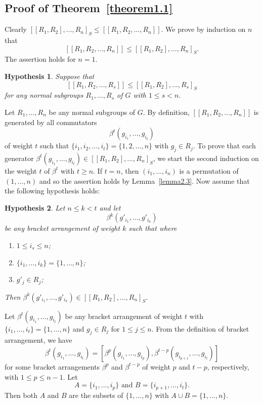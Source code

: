 \documentclass[10pt]{amsart}
\newtheorem{hypothesis}{Hypothesis}[section]
\numberwithin{equation}{section}
\begin{document}
\subsection{Proof of Theorem~\ref{theorem1.1}}
Clearly $[[R_1,R_2],\ldots,R_n]_S\leq [[R_1,R_2,\ldots, R_n]]$. We prove by induction on $n$ that $$[[R_1,R_2,\ldots,R_n]]\leq [[R_1,R_2],\ldots,R_n]_S.$$ The assertion holds for $n=1$.
\begin{hypothesis}\label{induction1}
Suppose that
$$
[[R_1,R_2,\ldots, R_s]]\leq [[R_1,R_2],\ldots, R_s]_S
$$
for any normal subgroups $R_1,\ldots,R_s$ of $G$ with $1\leq s<n$.
\end{hypothesis}

Let $R_1,\ldots, R_n$ be any normal subgroups of $G$. By definition, $[[R_1,R_2,\ldots,R_n]]$ is generated by all commutators $$\beta^t(g_{i_1},\ldots,g_{i_t})$$ of weight $t$ such that
$\{i_1,i_2,\ldots,i_t\}=\{1,2,\ldots,n\}$ with $g_j\in R_j$. To prove that each generator $\beta^t(g_{i_1},\ldots,g_{i_t})\in [[R_1,R_2],\ldots,R_n]_S$, we start the second induction on the weight $t$ of $\beta^t$ with $t\geq n$. If $t=n$, then $(i_1,\ldots,i_n)$ is a permutation of $(1,\ldots,n)$ and so the assertion holds by Lemma~\ref{lemma2.3}. Now assume that the following hypothesis holds:

\begin{hypothesis}\label{induction2}
Let $n\leq k<t$ and let
$$
\beta^k(g'_{i_1},\ldots,g'_{i_k})
$$
be any bracket arrangement of weight $k$ such that
where
\begin{enumerate}
\item[1)] $1\leq i_s\leq n$;
\item[2)] $\{i_1,\ldots,i_k\}=\{1,\ldots,n\}$;
\item[3)] $g'_j\in R_j$;
\end{enumerate}
Then $\beta^k(g'_{i_1},\ldots,g'_{i_k})\in [[R_1,R_2],\ldots,R_n]_S$.
\end{hypothesis}

Let $\beta^t(g_{i_1},\ldots,g_{i_t})$ be any bracket arrangement of weight $t$ with $\{i_1,\ldots,i_t\}=\{1,\ldots,n\}$ and $g_j\in R_j$ for $1\leq j\leq n$. From the definition of bracket arrangement, we have
$$
\beta^t(g_{i_1},\ldots,g_{i_t})=[\beta^p(g_{i_1},\ldots,g_{i_p}), \beta^{t-p}(g_{i_{p+1}},\ldots,g_{i_t})]
$$
for some bracket arrangements $\beta^p$ and $\beta^{t-p}$ of weight $p$ and $t-p$, respectively, with $1\leq p\leq n-1$. Let
$$
A=\{i_1,\ldots,i_p\}\textrm{ and } B=\{i_{p+1},\ldots,i_t\}.
$$
Then both $A$ and $B$ are the subsets of $\{1,\ldots,n\}$ with $A\cup B=\{1,\ldots,n\}$.
\end{document}
